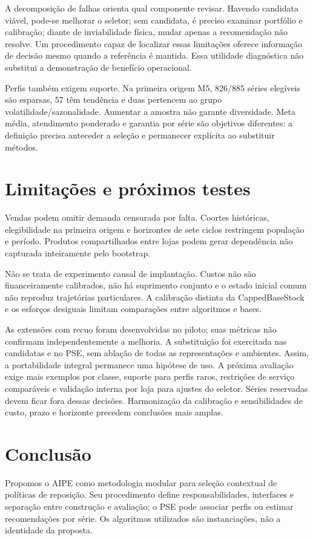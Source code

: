 \documentclass[preprint,12pt]{elsarticle}
\begin{document}
A decomposição de falhas orienta qual componente revisar. Havendo candidata viável, pode-se melhorar o seletor; sem candidata, é preciso examinar portfólio e calibração; diante de inviabilidade física, mudar apenas a recomendação não resolve. Um procedimento capaz de localizar essas limitações oferece informação de decisão mesmo quando a referência é mantida. Essa utilidade diagnóstica não substitui a demonstração de benefício operacional.

Perfis também exigem suporte. Na primeira origem M5, 826/885 séries elegíveis são esparsas, 57 têm tendência e duas pertencem ao grupo volatilidade/sazonalidade. Aumentar a amostra não garante diversidade. Meta média, atendimento ponderado e garantia por série são objetivos diferentes: a definição precisa anteceder a seleção e permanecer explícita ao substituir métodos.

\section{Limitações e próximos testes}
Vendas podem omitir demanda censurada por falta. Coortes históricas, elegibilidade na primeira origem e horizontes de sete ciclos restringem população e período. Produtos compartilhados entre lojas podem gerar dependência não capturada inteiramente pelo bootstrap.

Não se trata de experimento causal de implantação. Custos não são financeiramente calibrados, não há suprimento conjunto e o estado inicial comum não reproduz trajetórias particulares. A calibração distinta da CappedBaseStock e os esforços desiguais limitam comparações entre algoritmos e bases.

As extensões com recuo foram desenvolvidas no piloto; suas métricas não confirmam independentemente a melhoria. A substituição foi exercitada nas candidatas e no PSE, sem ablação de todas as representações e ambientes. Assim, a portabilidade integral permanece uma hipótese de uso. A próxima avaliação exige mais exemplos por classe, suporte para perfis raros, restrições de serviço comparáveis e validação interna por loja para ajustes do seletor. Séries reservadas devem ficar fora dessas decisões. Harmonização da calibração e sensibilidades de custo, prazo e horizonte precedem conclusões mais amplas.

\section{Conclusão}
Propomos o AIPE como metodologia modular para seleção contextual de políticas de reposição. Seu procedimento define responsabilidades, interfaces e separação entre construção e avaliação; o PSE pode associar perfis ou estimar recomendações por série. Os algoritmos utilizados são instanciações, não a identidade da proposta.
\end{document}
